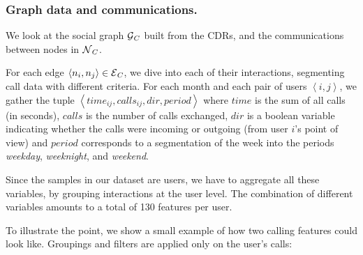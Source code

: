 \subsubsection{Graph data and communications.}


We look at the social graph $\operatorname{\mathcal{G}}_C$ built from the CDRs, and the communications between nodes in $\operatorname{\mathcal{N}}_C$.

	For each edge $\left< n_i, n_j \right> \in \operatorname{\mathcal{E}}_C$, we dive into each of their interactions, segmenting call data with different criteria. For %
	each month and each pair of users $\left< i,j \right>$, we gather the tuple $\left< time_{ij}, calls_{ij}, dir, period \right>$ where $time$ is the sum of all calls (in seconds), $calls$ is the number of calls exchanged, $dir$ is a boolean variable indicating whether the calls were incoming or outgoing (from user $i$'s point of view) and $period$ corresponds to a segmentation of the week into the periods \textit{weekday}, \textit{weeknight}, and \textit{weekend}.



Since the samples in our dataset are users, we have to aggregate all these variables, by grouping interactions at the user level. The combination of different variables amounts to a total of 130 features per user.
 
To illustrate the point, we show a small example of how two calling features could look like. Groupings and filters are applied only on the user's calls:


